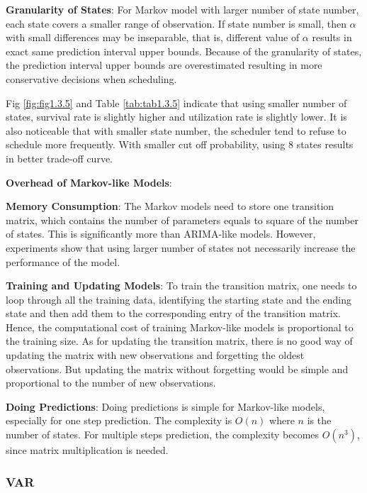 \documentclass{article}
\begin{document}
\begin{flushleft}
\textbf{Granularity of States}: For Markov model with larger number of state number, each state covers a smaller range of observation. If state number is small, then $\alpha$ with small differences may be inseparable, that is, different value of $\alpha$ results in exact same prediction interval upper bounds. Because of the granularity of states, the prediction interval upper bounds are overestimated resulting in more conservative decisions when scheduling.

Fig \ref{fig:fig1.3.5} and Table \ref{tab:tab1.3.5} indicate that using smaller number of states, survival rate is slightly higher and utilization rate is slightly lower. It is also noticeable that with smaller state number, the scheduler tend to refuse to schedule more frequently. With smaller cut off probability, using $8$ states results in better trade-off curve.
\end{flushleft}

\textbf{Overhead of Markov-like Models}:
\begin{flushleft}
\textbf{Memory Consumption}: The Markov models need to store one transition matrix, which contains the number of parameters equals to square of the number of states. This is significantly more than ARIMA-like models. However, experiments show that using larger number of states not necessarily increase the performance of the model.

\textbf{Training and Updating Models}: To train the transition matrix, one needs to loop through all the training data, identifying the starting state and the ending state and then add them to the corresponding entry of the transition matrix. Hence, the computational cost of training Markov-like models is proportional to the training size. As for updating the transition matrix, there is no good way of updating the matrix with new observations and forgetting the oldest observations. But updating the matrix without forgetting would be simple and proportional to the number of new observations.

\textbf{Doing Predictions}: Doing predictions is simple for Markov-like models, especially for one step prediction. The complexity is $O(n)$ where $n$ is the number of states. For multiple steps prediction, the complexity becomes $O(n^3)$, since matrix multiplication is needed.
\end{flushleft}

\subsubsection{VAR}
\end{document}
